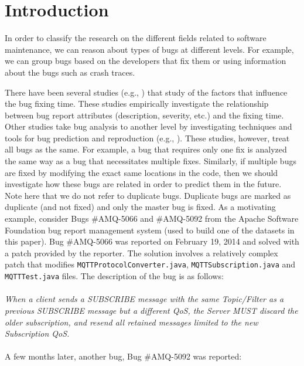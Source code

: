
\section{Introduction}





In order to classify the research on the different fields related to software maintenance, we can reason about types of bugs at different levels. For
example, we can group bugs based on the developers that fix
them or using information about the bugs such as crash traces.

There have been several studies (e.g., \cite{Weiß2007, Zhang2013}) that study of the factors that influence the bug fixing time.
These studies   empirically investigate the relationship between bug report attributes (description, severity, etc.) and the fixing time.
Other studies take bug analysis to another level by investigating techniques and tools for bug prediction and reproduction (e.g., \cite{Chen2013, Kim2007a, Nayrolles2015}).
These studies, however, treat all bugs as the same.
For example, a bug that requires only one fix is analyzed the same way as a bug that necessitates multiple fixes.
Similarly, if multiple bugs are fixed by modifying the exact same locations in the code, then we should investigate how these bugs are related in order to predict them in the future.
Note here that we do not refer to duplicate bugs.
Duplicate bugs are marked as duplicate (and not fixed) and only the master bug is fixed.
As a motivating example, consider Bugs \#AMQ-5066 and \#AMQ-5092 from the Apache Software Foundation bug report management system (used to build one of the datasets in this paper).
Bug \#AMQ-5066 was reported on February 19, 2014 and solved with a patch provided by the reporter.
The solution involves a relatively complex patch that modifies {\tt MQTTProtocolConverter.java}, {\tt MQTTSubscription.java} and {\tt MQTTTest.java} files.
The description of the bug is as follows:
\\ \\
{\it When a client sends a SUBSCRIBE message with the same Topic/Filter as a previous SUBSCRIBE message but a different QoS, the Server MUST discard the older subscription, and resend all retained messages limited to the new Subscription QoS.}
\\ \\
A few months later, another bug, Bug \#AMQ-5092 was reported:
